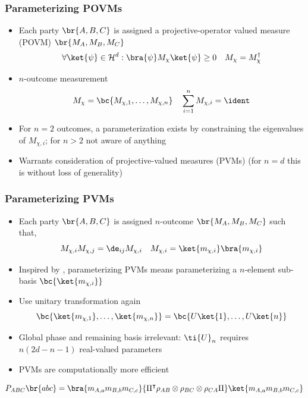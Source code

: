 \documentclass[
    hyperref={bookmarks=false},%
    xcolor={dvipsnames},
]{beamer}
\renewcommand{\term}[1]{\textcolor{Mahogany}{#1}}
\begin{document}
\begin{frame}
    \frametitle{Parameterizing POVMs}
    \begin{itemize}
        \item Each party $\br{A, B, C}$ is assigned a \term{projective-operator valued measure (POVM)} $\br{M_A, M_B, M_C}$
        \[ \forall \ket{\psi} \in \Hilb^d : \bra{\psi} M_\chi \ket{\psi} \geq 0 \quad M_\chi = M_\chi^{\dagger} \]
        \item $n$-outcome measurement
        \[ M_\chi = \bc{M_{\chi, 1}, \ldots, M_{\chi, n}} \quad \sum_{i=1}^{n} M_{\chi, i} = \ident \]
        \item For $n = 2$ outcomes, a parameterization exists by constraining the eigenvalues of $M_{\chi, i}$; for $n > 2$ not aware of anything
        \item Warrants consideration of \term{projective-valued measures (PVMs)} (for $n = d$ this is without loss of generality)
    \end{itemize}
\end{frame}

\begin{frame}
    \frametitle{Parameterizing PVMs}
    \begin{itemize}
        \item Each party $\br{A, B, C}$ is assigned $n$-outcome $\br{M_A, M_B, M_C}$ such that,
        \[ M_{\chi,i}M_{\chi,j} = \de_{ij} M_{\chi, i} \quad M_{\chi, i} = \ket{m_{\chi,i}}\bra{m_{\chi,i}} \]
        \item Inspired by \cite{Pal_2010}, parameterizing PVMs means parameterizing a $n$-element sub-basis $\bc{\ket{m_{\chi,i}}}$
        \item Use unitary transformation again
        \[ \bc{\ket{m_{\chi,1}}, \ldots, \ket{m_{\chi,n}}} = \bc{U \ket{1}, \ldots, U \ket{n}} \]
        \item Global phase and remaining basis irrelevant: $\ti{U}_{n}$ requires $n(2d - n - 1)$ real-valued parameters\
        \item PVMs are computationally more efficient
    \end{itemize}
    \[ \prob[ABC]\br{abc} = \bra{m_{A,a}m_{B,b}m_{C,c}}{\netperm^\intercal \rho_{AB}\otimes\rho_{BC}\otimes\rho_{CA} \netperm}\ket{m_{A,a}m_{B,b}m_{C,c}} \]
\end{frame}
\end{document}
